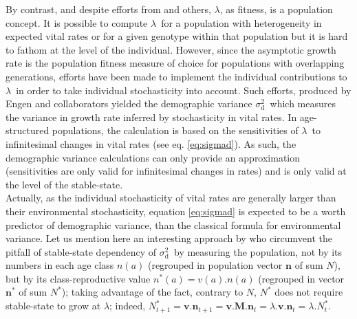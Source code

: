 \documentclass[10pt,a4paper]{article}
\newcommand{\lam}{$\lambda$}
\newcommand{\vd}{$\sigma_{\mathrm{d}}^2$}
\begin{document}
By contrast, and despite efforts from \citep{McGraw1996} and others, \lam, as fitness, is a population concept. It is possible to compute  \lam\  for a population with heterogeneity in expected vital rates  or for a given genotype within that population \citep{Charlesworth2000} but it is hard to fathom at the level of the individual. However, since the asymptotic growth rate is the population fitness measure of choice for populations with overlapping generations, efforts have been made to implement the individual contributions to \lam\ in order to take individual stochasticity into account. Such efforts, produced by Engen and collaborators \citep{Engen1998a,Engen2005b,Engen2005c} yielded the demographic variance \vd\ which measures the variance in growth rate inferred by stochasticity in vital rates. In age-structured populations, the calculation is based on the sensitivities of \lam\ to infinitesimal changes in vital rates (see eq. \ref{eq:sigmad}). As such, the demographic variance calculations can only provide an approximation (sensitivities are only valid for infinitesimal changes in rates) and is only valid at the level of the stable-state.\\

Actually, as the individual stochasticity of vital rates are generally larger than their environmental stochasticity, equation \ref{eq:sigmad} is expected to be a worth predictor of demographic variance, than 
the classical formula for environmental variance.  Let us mention here an interesting approach by \citep{Engen2007,Engen2009a} who circumvent the pitfall of stable-state dependency of \vd\ by measuring the population, not by its numbers in each age class $n(a)$ (regrouped in population vector $\bm{n}$ of sum $N$), but by its class-reproductive value $n^{*}(a)=v(a).n(a)$ (regrouped in vector $\bm{n^{*}}$ of sum $N^{*}$); taking advantage of the fact, contrary to $N$, $N^{*}$ does not require stable-state to grow at \lam; indeed, $N^{*}_{t+1}=\bm{v}.\bm{n}_{t+1}=\bm{v}.\mathbf{M}.\bm{n}_{t}=\lambda.\bm{v}.\bm{n}_{t}=\lambda.N^{*}_{t}$.

\end{document}
